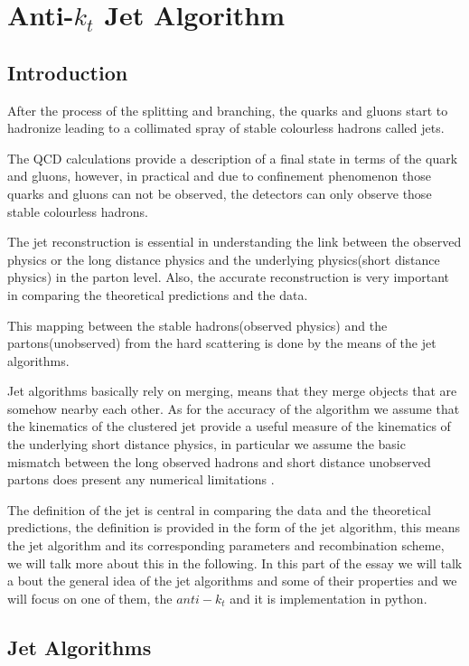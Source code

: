 \chapter{Anti-$k_{t}$ Jet Algorithm}

\section{Introduction}
After the process of the splitting and branching, the quarks and gluons start to hadronize leading to a collimated spray of stable colourless hadrons called jets. 

The QCD calculations provide a description of a final state in terms of the quark and gluons, however, in practical and due to confinement phenomenon those quarks and gluons can not be observed, the detectors can only observe those stable colourless hadrons. 

The jet reconstruction is essential in understanding the link between the observed physics or the long distance physics and the underlying physics(short distance physics) in the parton level. Also, the accurate reconstruction is very important in comparing the theoretical predictions and the data. 

This mapping between the stable hadrons(observed physics) and the partons(unobserved) from the hard scattering is done by the means of the jet algorithms. 

Jet algorithms basically rely on merging, means that they merge objects that are somehow nearby each other.  As for the accuracy of the algorithm we assume that the kinematics of the clustered jet provide a useful measure of the kinematics of the underlying short distance physics, in particular we assume the basic mismatch between the long observed hadrons and short distance unobserved partons does present any numerical limitations \citep{Ellis:2007ib}. 

    
The definition of the jet is central in comparing the data and the theoretical predictions, the definition is provided in the form of the jet algorithm, this means the jet algorithm and its corresponding parameters and recombination scheme, we will talk more about this in the following. In this part of the essay we will talk a bout the general idea of the jet algorithms and some of their properties and we will focus on one of them, the $anti-k_{t}$ and it is implementation in python.  

\section{Jet Algorithms}

